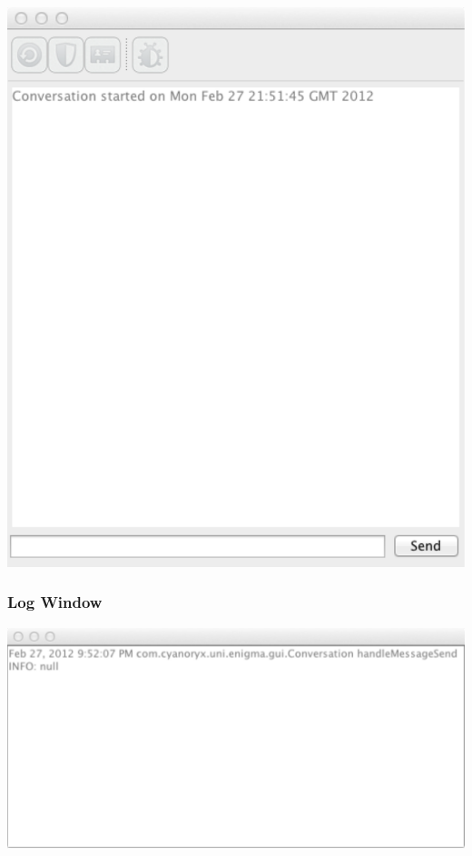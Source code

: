     \begin{center}
        \includegraphics[scale=0.7]{./Figures/Ch6/6-3-1-2-chat_window.pdf}
     \end{center}
    
    \subsubsection{Log Window}
    
    \begin{center}
        \includegraphics[scale=0.5]{./Figures/Ch6/6-3-1-2-log_window.pdf}
     \end{center}
    
